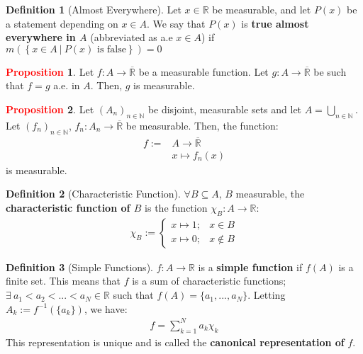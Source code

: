 \documentclass[11pt]{article}
\theoremstyle{definition}
\newtheorem{question}{Question}
\newcommand{\bb}[1]{\mathbb{#1}}
\newcommand{\sets}[2]{ \left\{ #1\ |\ #2 \right\}}
\theoremstyle{definition}
\newtheorem{definition}{\textcolor{OliveGreen}{Definition}}
\newtheorem{prop}{\textcolor{red}{Proposition}}
\theoremstyle{remark}
\begin{document}
\begin{definition}[Almost Everywhere]
	Let $x \in \bb{R}$ be measurable, and let $P(x)$ be a statement depending on $x \in A$. We say that $P(x)$ is \textbf{true almost everywhere in $A$} (abbreviated as a.e $x \in A$) if $m(\sets{x \in A}{P(x) \mbox{ is false} })=0$
\end{definition}


\begin{prop}
	Let $f: A \rightarrow \overline{\bb{R}}$ be a measurable function. Let $g: A \rightarrow \overline{\bb{R}}$ be such that $f = g$ a.e. in $A$. Then, $g$ is measurable. 
\end{prop}

\begin{prop}
	Let $(A_n)_{n \in \bb{N}}$ be disjoint, measurable sets and let $A = \bigcup_{n \in \bb{N}}$. Let $(f_n)_{n \in \bb{N}}$, $f_n: A_n \rightarrow \overline{\bb{R}}$ be measurable. Then, the function: 
	\begin{align*}
		f:= & A \rightarrow \overline{ \bb{R}	} \\
		& x \mapsto f_n(x) 
	\end{align*}
	is measurable. 
\end{prop}

\begin{definition}[Characteristic Function]
	$\forall B \subseteq A$, $B$ measurable, the \textbf{characteristic function of $B$} is the function $\chi_B: A \rightarrow \bb{R}$: 
	\begin{align}
		\chi_B := \begin{cases}
			x \mapsto 1; & x \in B \\
			x \mapsto 0; & x \notin B 
		\end{cases}
	\end{align}
\end{definition}

\begin{definition}[Simple Functions]
	$f: A \rightarrow \bb{R}$ is a \textbf{simple function} if $f(A)$ is a finite set. This means that $f$ is a sum of characteristic functions; $\exists\ a_1 < a_2 < ... < a_N \in \bb{R}$ such that $f(A) = \{ a_1, ..., a_N \}$. Letting $A_k := f^{-1}(\{ a_k \})$, we have: 
	\begin{align*}
		f = \sum_{k=1}^N a_k \chi_k	
	\end{align*}
	This representation is unique and is called the \textbf{canonical representation of} $f$. 
\end{definition}
\end{document}
